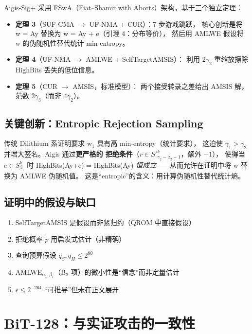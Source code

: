 \documentclass[11pt,a4paper]{ctexart}
\begin{document}
Aigis-Sig+ 采用 FSwA（Fiat--Shamir with Aborts）架构，基于三个独立定理：

\begin{itemize}
  \item \textbf{定理 3}（SUF-CMA $\to$ UF-NMA + CUR）：7 步游戏跳跃，
        核心创新是将 w = Ay 替换为 w = Ay + e（引理 4：分布等价），
        然后用 AMLWE 假设将 w 的伪随机性替代统计 min-entropy。
  \item \textbf{定理 4}（UF-NMA $\to$ AMLWE + SelfTargetAMSIS）：
        利用 2$\gamma_2$ 重缩放擦除 HighBits 丢失的低位信息。
  \item \textbf{定理 5}（CUR $\to$ AMSIS，标准模型）：
        两个接受转录之差给出 AMSIS 解，范数 $2\gamma_3$（而非 $4\gamma_2$）。
\end{itemize}

\subsection{关键创新：Entropic Rejection Sampling}

\begin{keybox}
传统 Dilithium 系证明要求 w$_1$ 具有高 min-entropy（统计要求），
这迫使 $\gamma_1 > \gamma_2$ 并增大签名。Aigis 通过\textbf{更严格的
拒绝条件}（$r \in S'^k_{\gamma_2 - \beta_2 - 1}$，额外 $-1$），
使得当 $e \in S^k_{\beta_1}$ 时 HighBits(Ay+e) = HighBits(Ay)
\emph{恒成立}——从而允许在证明中将 w 替换为 AMLWE 伪随机值。
这是``entropic''的含义：用计算伪随机性替代统计熵。
\end{keybox}

\subsection{证明中的假设与缺口}

\begin{enumerate}
  \item SelfTargetAMSIS 是假设而非紧归约（QROM 中直接假设）
  \item 拒绝概率 $\tilde{p}$ 用启发式估计（非精确）
  \item 查询预算假设 $q_S, q_H \le 2^{80}$
  \item AMLWE$_{\alpha_1, \beta_1}$（B$_2$ 项）的微小性是``信念''而非定量估计
  \item $\epsilon \le 2^{-264}$ ``可推导''但未在正文展开
\end{enumerate}

\section{BiT-128：与实证攻击的一致性}
\end{document}
